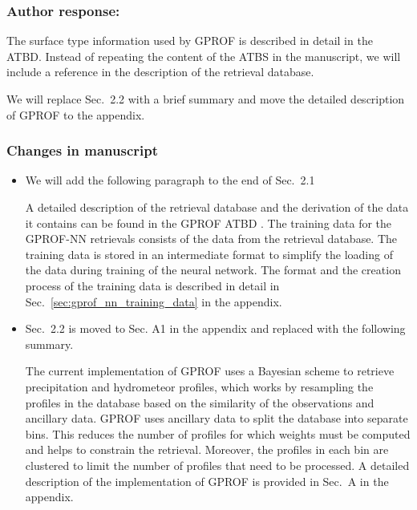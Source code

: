 \subsubsection*{Author response:}

The surface type information used by GPROF is described in detail in the ATBD.
Instead of repeating the content of the ATBS in the manuscript, we will
 include a reference in the description of the retrieval database.

We will replace Sec.~2.2 with a brief summary and move the detailed description of
GPROF to the appendix.

\subsubsection{Changes in manuscript}

\begin{itemize}
  \item We will add the following paragraph to the end of Sec.~2.1
    \begin{change}[152]
        A detailed description of the retrieval database and the derivation of the data
        it contains can be found in the GPROF ATBD \citep{atbd}. The training data for the
        GPROF-NN retrievals consists of the data from the retrieval database. The
        training data is stored in an intermediate format to simplify the loading of the
        data during training of the neural network. The format and the creation process
        of the training data is described in detail in Sec.~\ref{sec:gprof_nn_training_data}
        in the appendix.
    \end{change}

  \item Sec.~2.2 is moved to Sec. A1 in the appendix and replaced with the following summary.
    \begin{change}[156]
    The current implementation of GPROF uses a Bayesian scheme to retrieve
    precipitation and hydrometeor profiles, which works by resampling the profiles
    in the database based on the similarity of the observations and ancillary data.
    GPROF uses ancillary data to split the database into separate bins. This reduces
    the number of profiles for which weights must be computed and helps to constrain
    the retrieval. Moreover, the profiles in each bin are clustered to limit the
    number of profiles that need to be processed. A detailed description of the
    implementation of GPROF is provided in Sec.~A in the appendix.

    \end{change}
\end{itemize}

